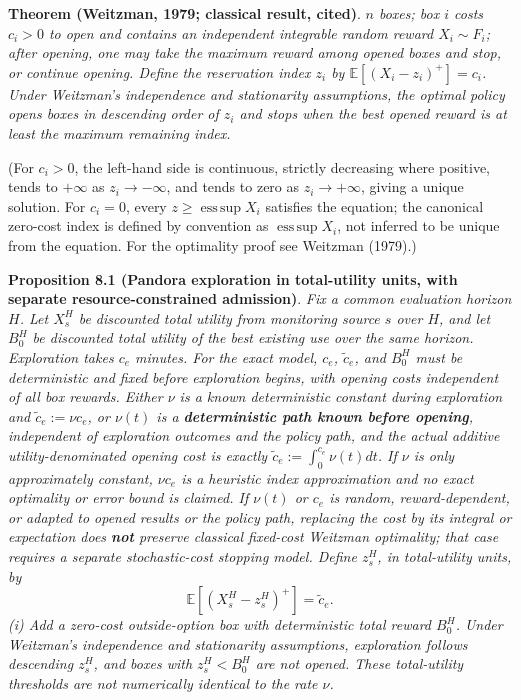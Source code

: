 \documentclass[
  11pt]{article}
\begin{document}
\textbf{Theorem (Weitzman, 1979; classical result, cited)}. \emph{\(n\)
boxes; box \(i\) costs \(c_i>0\) to open and contains an independent
integrable random reward \(X_i\sim F_i\); after opening, one may take
the maximum reward among opened boxes and stop, or continue opening.
Define the reservation index \(z_i\) by \(\mathbb E[(X_i-z_i)^+]=c_i\).
Under Weitzman's independence and stationarity assumptions, the optimal
policy opens boxes in descending order of \(z_i\) and stops when the
best opened reward is at least the maximum remaining index.}

(For \(c_i>0\), the left-hand side is continuous, strictly decreasing
where positive, tends to \(+\infty\) as \(z_i\to-\infty\), and tends to
zero as \(z_i\to+\infty\), giving a unique solution. For \(c_i=0\),
every \(z\ge\operatorname{ess\,sup}X_i\) satisfies the equation; the
canonical zero-cost index is defined by convention as
\(\operatorname{ess\,sup}X_i\), not inferred to be unique from the
equation. For the optimality proof see Weitzman (1979).)

\textbf{Proposition 8.1 (Pandora exploration in total-utility units,
with separate resource-constrained admission)}. \emph{Fix a common
evaluation horizon \(H\). Let \(X_s^H\) be discounted total utility from
monitoring source \(s\) over \(H\), and let \(B_0^H\) be discounted
total utility of the best existing use over the same horizon.
Exploration takes \(c_e\) minutes. For the exact model, \(c_e\),
\(\widetilde c_e\), and \(B_0^H\) must be deterministic and fixed before
exploration begins, with opening costs independent of all box rewards.
Either \(\nu\) is a known deterministic constant during exploration and
\(\widetilde c_e:=\nu c_e\), or \(\nu(t)\) is a \textbf{deterministic
path known before opening}, independent of exploration outcomes and the
policy path, and the actual additive utility-denominated opening cost is
exactly \(\widetilde c_e:=\int_0^{c_e}\nu(t)dt\). If \(\nu\) is only
approximately constant, \(\nu c_e\) is a heuristic index approximation
and no exact optimality or error bound is claimed. If \(\nu(t)\) or
\(c_e\) is random, reward-dependent, or adapted to opened results or the
policy path, replacing the cost by its integral or expectation does
\textbf{not} preserve classical fixed-cost Weitzman optimality; that
case requires a separate stochastic-cost stopping model. Define
\(z_s^H\), in total-utility units, by}
\[\mathbb E[(X_s^H-z_s^H)^+]=\widetilde c_e.\] \emph{(i) Add a zero-cost
outside-option box with deterministic total reward \(B_0^H\). Under
Weitzman's independence and stationarity assumptions, exploration
follows descending \(z_s^H\), and boxes with \(z_s^H<B_0^H\) are not
opened. These total-utility thresholds are not numerically identical to
the rate \(\nu\).}
\end{document}
